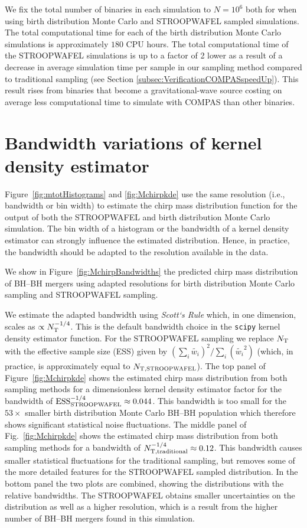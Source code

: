 \documentclass[a4paper,fleqn,usenatbib,useAMS,usedcolumn]{mnras}
\newcommand{\AISs}{\textsc{STROOPWAFEL}}
\begin{document}
We fix the total number of binaries in each simulation to $N =  10^6$ both for when using birth distribution Monte Carlo and \AISs{} sampled simulations. The total computational time for each of the birth distribution Monte Carlo simulations is approximately $180$ CPU hours. The total computational time of the \AISs{} simulations is up to a factor of 2 lower as a result of a decrease in average simulation time per sample in our sampling method compared to traditional sampling (see Section \ref{subsec:VerificationCOMPASspeedUp}). This  result rises from  binaries that become a gravitational-wave source costing on average less computational time to simulate with \textsc{COMPAS} than other binaries.  



\section{Bandwidth variations of kernel density estimator}
\label{app:KDEbandwidth}

Figure~\ref{fig:mtotHistograms} and \ref{fig:Mchirpkde} use the same resolution (i.e., bandwidth or bin width) to estimate the chirp mass distribution function for the output of both the \AISs{} and birth distribution Monte Carlo simulation.  The bin width of a histogram or the bandwidth of a kernel density estimator can strongly influence the estimated distribution.  Hence, in practice, the bandwidth should be adapted to the resolution available in the data.


We show in  Figure~\ref{fig:MchirpBandwidths} the predicted  chirp mass distribution of BH--BH  mergers using  adapted resolutions for  birth distribution Monte Carlo sampling and \AISs{} sampling.  

We estimate the adapted bandwidth using \textit{Scott`s Rule}  which, in one dimension,  scales as $\propto N_{\rm{T}}^{-1/4}$. This is the  default bandwidth choice in  the \texttt{scipy} kernel density estimator function. For the \AISs{} sampling we replace $N_{\rm{T}}$ with the effective sample size (ESS) given by $(\sum_i \widetilde{w_i})^2 / \sum_i(\widetilde{w_i}^2)$ (which, in practice, is approximately equal to $N_{\rm{T, \AISs}}$). 
The top panel of  Figure~\ref{fig:Mchirpkde} shows  the estimated  chirp mass distribution from both sampling methods for a  dimensionless kernel density estimator factor for the bandwidth of 
$\rm{ESS}_{\rm{STROOPWAFEL}}^{-1/4} \approx 0.044$. This bandwidth is too small for the $53\times$ smaller birth distribution Monte Carlo BH--BH population which therefore shows significant statistical noise  fluctuations.
The middle panel of Fig.~\ref{fig:Mchirpkde} shows  the estimated  chirp mass distribution from both sampling methods for a bandwidth  of $N_{\rm{T, traditional}}^{-1/4} \approx 0.12$.   This bandwidth causes smaller statistical fluctuations for the traditional sampling, but removes some of the more detailed features for the \AISs{} sampled distribution.  In the bottom panel the two plots are combined, showing the distributions with the relative bandwidths. The \AISs{} obtains smaller uncertainties on the distribution as well as a higher resolution, which is a result from the higher number of BH--BH mergers found in this simulation. 
\end{document}
